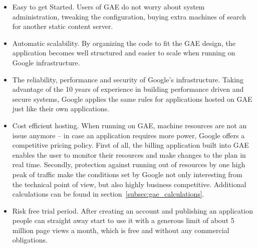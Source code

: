 \begin{itemize}
\item{Easy to get Started. Users of GAE do not worry about system administration, tweaking the configuration, buying extra machines of search for another static content server.}
\item{Automatic scalability. By organizing the code to fit the GAE design, the application becomes well structured and easier to scale when running on Google infrastructure.} 
\item{The reliability, performance and security of Google's infrastructure. Taking advantage of the 10 years of experience in building performance driven and secure systems, Google applies the same rules for applications hosted on GAE just like their own applications.}
\item{Cost efficient hosting. When running on GAE, machine resources are not an issue anymore -- in case an application requires more power, Google offers a competitive pricing policy. First of all, the billing application built into GAE enables the user to monitor their resources and make changes to the plan in real time. Secondly, protection against running out of resources by one high peak of traffic make the conditions set by Google not only interesting from the technical point of view, but also highly business competitive. Additional calculations can be found in section~\ref{subsec:gae_calculations}.}
\item{Risk free trial period. After creating an account and publishing an application people can straight away start to use it with a generous limit of about 5 million page views a month, which is free and without any commercial obligations.}
\end{itemize}

